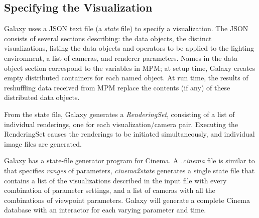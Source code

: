 \documentclass[journal]{IEEEtran}
\begin{document}
\subsection{Specifying the Visualization}

Galaxy uses a JSON text file (a \textit{state} file) to specify a visualization.  The JSON consists of several sections describing: the data objects, the distinct visualizations, listing the data objects and operators to be applied to the lighting environment, a list of cameras, and renderer parameters.  Names in the data object section correspond to the variables in MPM; at setup time, Galaxy creates empty distributed containers for each named object.  At run time, the results of reshuffling data received from MPM replace the contents (if any) of these distributed data objects.  

From the state file, Galaxy generates a \textit{RenderingSet}, consisting of a list of individual renderings, one for each visualization/camera pair.  Executing the RenderingSet causes the renderings to be initiated simultaneously, and individual image files are generated.

Galaxy has a state-file generator program for Cinema.  A \textit{.cinema} file is similar to that specifies \textit{ranges} of parameters, \textit{cinema2state} generates a single state file that contains a list of the visualizations described in the input file with every combination of parameter settings, and a list of cameras with all the combinations of viewpoint parameters.  Galaxy will generate a complete Cinema database with an interactor for each varying parameter and time.
\end{document}
